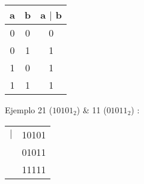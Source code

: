 \begin{tabular}{c|c|c}
	a	& b &  a $|$ b \\
	\hline
	0	& 0 & 0 \\
	
	0	& 1 & 1 \\
	
	1	& 0 & 1  \\
	
	1	& 1 & 1 \\
\end{tabular}

Ejemplo 21 ($10101_2$) \& 11 ($01011_2$) :

\begin{tabular}{c|c|}
	$|$	& 10101  \\
	    & 01011 \\
	\hline
	    & 11111  \\
\end{tabular} 